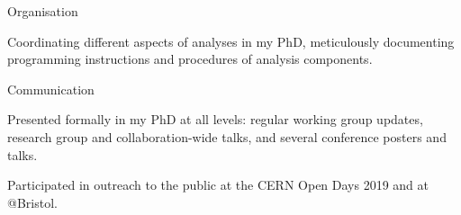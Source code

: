 \begin{cventries}
    \cventry
    {}
    {Organisation}
    {}
    {}
    {
      \begin{cvitems}
        \item {Coordinating different aspects of analyses in my PhD, meticulously documenting programming instructions and procedures of analysis components.}
        \vpadding
        \end{cvitems}
        }

    \cventry
    {}
    {Communication}
    {}
    {}
    {
      \begin{cvitems}
        \item {Presented formally in my PhD at all levels: regular working group updates, research group and collaboration-wide talks, and several conference posters and talks.}
        \item {Participated in outreach to the public at the CERN Open Days 2019 and at @Bristol.}
        \end{cvitems}
    }

\end{cventries}

